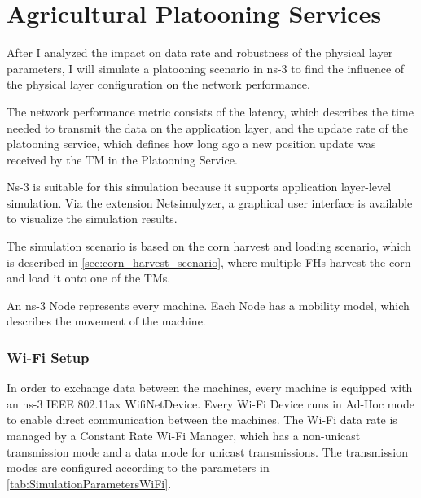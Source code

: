 \section{Agricultural Platooning Services}

After I analyzed the impact on data rate and robustness of the physical layer parameters, I will simulate a platooning scenario in ns-3 to find the influence of the physical layer configuration on the network performance.

The network performance metric consists of the latency, which describes the time needed to transmit the data
on the application layer, and the update rate of the platooning service, which defines how long ago a new position update
was received by the \ac{TM} in the Platooning Service.

Ns-3 is suitable for this simulation because it supports application layer-level simulation.
Via the extension Netsimulyzer, a graphical user interface is available to visualize the simulation results.

The simulation scenario is based on the corn harvest and loading scenario, which is described in \autoref{sec:corn_harvest_scenario}, where
multiple \ac{FH}s harvest the corn and load it onto one of the \ac{TM}s.

An ns-3 Node represents every machine.
Each Node has a mobility model, which describes the movement of the machine.

\subsubsection*{Wi-Fi Setup}
In order to exchange data between the machines, every machine is equipped with an  ns-3 IEEE 802.11ax WifiNetDevice.
Every Wi-Fi Device runs in Ad-Hoc mode to enable direct communication
between the machines.
The Wi-Fi data rate is managed by a Constant Rate Wi-Fi Manager, which has a non-unicast
transmission mode and a data mode for unicast transmissions.
The transmission modes are configured according
to the parameters in \autoref{tab:SimulationParametersWiFi}.


